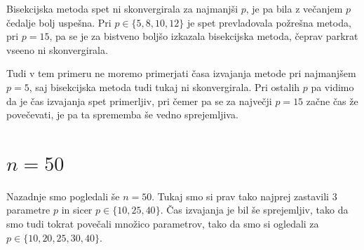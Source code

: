 \documentclass[a4paper]{article}
\begin{document}
Bisekcijska metoda spet ni skonvergirala za najmanjši $p$, je pa bila z večanjem $p$ čedalje bolj uspešna. Pri $p \in \{5, 8, 10, 12\}$ je spet prevladovala požrešna metoda, pri $p = 15$, pa se je za bistveno boljšo izkazala bisekcijska metoda, čeprav parkrat vseeno ni skonvergirala. 

Tudi v tem primeru ne moremo primerjati časa izvajanja metode pri najmanjšem $p = 5$, saj bisekcijska metoda tudi tukaj ni skonvergirala. Pri ostalih $p$ pa vidimo da je čas izvajanja spet primerljiv, pri čemer pa se za največji $p = 15$ začne čas že povečevati, je pa ta sprememba še vedno sprejemljiva.

\section{$n = 50$}
Nazadnje smo pogledali še $n = 50$. Tukaj smo si prav tako najprej zastavili $3$ parametre $p$ in sicer $p \in \{10, 25, 40\}$. Čas izvajanja je bil še sprejemljiv, tako da smo tudi tokrat povečali množico parametrov, tako da smo si ogledali za $p \in \{10, 20, 25, 30, 40\}$. 
\end{document}
